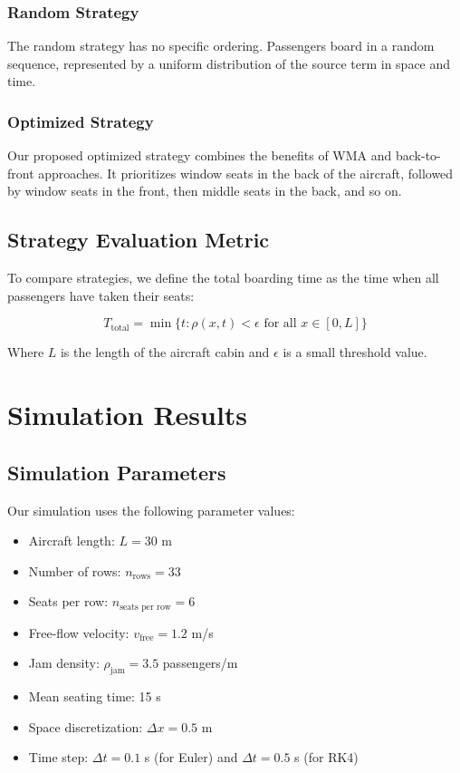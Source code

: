 \documentclass[a4paper,12pt]{article}
\begin{document}
\subsubsection{Random Strategy}

The random strategy has no specific ordering. Passengers board in a random sequence, represented by a uniform distribution of the source term in space and time.

\subsubsection{Optimized Strategy}

Our proposed optimized strategy combines the benefits of WMA and back-to-front approaches. It prioritizes window seats in the back of the aircraft, followed by window seats in the front, then middle seats in the back, and so on.

\subsection{Strategy Evaluation Metric}

To compare strategies, we define the total boarding time as the time when all passengers have taken their seats:

\begin{equation}
T_{\text{total}} = \min\{t : \rho(x,t) < \epsilon \text{ for all } x \in [0, L]\}
\end{equation}

Where $L$ is the length of the aircraft cabin and $\epsilon$ is a small threshold value.

\section{Simulation Results}

\subsection{Simulation Parameters}

Our simulation uses the following parameter values:
\begin{itemize}
    \item Aircraft length: $L = 30$ m
    \item Number of rows: $n_{\text{rows}} = 33$
    \item Seats per row: $n_{\text{seats per row}} = 6$
    \item Free-flow velocity: $v_{\text{free}} = 1.2$ m/s
    \item Jam density: $\rho_{\text{jam}} = 3.5$ passengers/m
    \item Mean seating time: 15 s
    \item Space discretization: $\Delta x = 0.5$ m
    \item Time step: $\Delta t = 0.1$ s (for Euler) and $\Delta t = 0.5$ s (for RK4)
\end{itemize}
\end{document}
